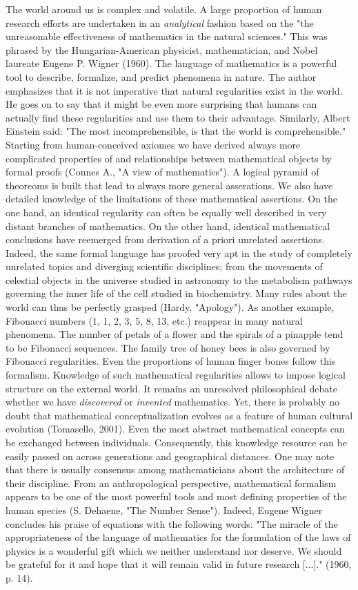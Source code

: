 \documentclass[authoryear,review,3p]{elsarticle}
\begin{document}
The world around us is complex and volatile.
%
A large proportion of human research efforts are undertaken
in an \textit{analytical} fashion
based on the 
"the unreasonable effectiveness of mathematics in the natural sciences."
This was phrased by the Hungarian-American
physicist, mathematician, and Nobel laureate Eugene P. Wigner (1960).
The language of mathematics is a powerful tool to
describe, formalize, and predict phenomena in nature.
The author emphasizes that it is not imperative that
natural regularities exist in the world. He goes on to
say that it might be even more surprising that humans can actually
find these regularities and use them to their advantage.
Similarly, Albert Einstein said:
"The most incomprehensible, is that the world is comprehensible." 
%
Starting from human-conceived axiomes
we have derived always more complicated
properties of and relationships between mathematical objects by formal proofs
(Connes A., "A view of mathematics").
A logical pyramid of theoreoms is built that lead to always
more general asserations.
We also have detailed knowledge of the limitations of these mathematical
assertions.
%
On the one hand,
an identical regularity can often be equally well described in very distant
branches of mathematics.
On the other hand,
identical mathematical conclusions have reemerged from derivation of
a priori unrelated assertions.
%
Indeed, the same formal language has proofed very apt in
the study of completely unrelated topics and diverging scientific disciplines;
from the movements of celestial objects in the universe
studied in astronomy
to
the metabolism pathways governing the inner life of the cell
studied in biochemistry.
%
Many rules about the world can thus be perfectly grasped
(Hardy, "Apology").
As another example,
Fibonacci numbers (1, 1, 2, 3, 5, 8, 13, etc.)
reappear in many natural phenomena.
The number of petals of a flower and the spirals of a pinapple tend
to be Fibonacci sequences.
The family tree of honey bees is also governed by Fibonacci regularities.
Even the proportions of human finger bones follow this formalism.
Knowledge of such mathematical regularities
allows to impose logical structure on the external world.
%
It remains an unresolved philosophical debate whether we have
\textit{discovered} or \textit{invented} mathematics.
Yet, there is probably no doubt
that mathematical conceptualization
evolves as a feature of human cultural evolution (Tomasello, 2001).
Even the most abstract mathematical concepts can
be exchanged between individuals. Consequently,
this knowledge resource can be easily passed
on across generations and geographical distances.
One may note that
there is usually consensus among mathematicians
about the architecture of their discipline.
From an anthropological perspective,
mathematical formalism
appears to be one of the most
powerful tools and most defining properties of the human species
(S. Dehaene, "The Number Sense").
Indeed,
Eugene Wigner concludes his praise of equations with the following words:
"The miracle of the appropriateness of the language of mathematics
for the formulation of the laws of physics is a wonderful gift
which we neither understand nor deserve. We should be grateful for
it and hope that it will remain valid in future research [...]."
(1960, p. 14).
\end{document}
